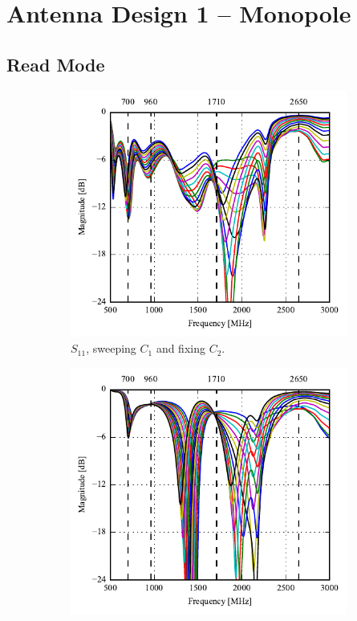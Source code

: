 \section{Antenna Design 1 -- Monopole}

\subsection{Read Mode}
\begin{figure}[htbp]
   \begin{subfigure}[b]{0.49\linewidth}
        \centering
        \includegraphics{img/tech_sol/monopole/read_mode/s11}
        \caption{$S_{11}$, sweeping $C_1$ and fixing $C_2$.}
        \label{fig:ant1_s11}
    \end{subfigure}
    \hfill
    \begin{subfigure}[b]{0.49\linewidth}
        \centering
        \includegraphics{img/tech_sol/monopole/read_mode/s22}

\end{subfigure}
\end{figure}
